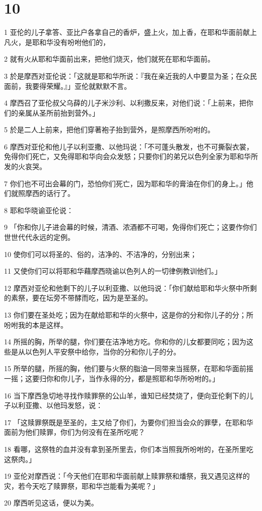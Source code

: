 \chapter{10}

\par 1 亚伦的儿子拿答、亚比户各拿自己的香炉，盛上火，加上香，在耶和华面前献上凡火，是耶和华没有吩咐他们的，
\par 2 就有火从耶和华面前出来，把他们烧灭，他们就死在耶和华面前。
\par 3 於是摩西对亚伦说：「这就是耶和华所说：『我在亲近我的人中要显为圣；在众民面前，我要得荣耀。』」亚伦就默默不言。
\par 4 摩西召了亚伦叔父乌薛的儿子米沙利、以利撒反来，对他们说：「上前来，把你们的亲属从圣所前抬到营外。」
\par 5 於是二人上前来，把他们穿著袍子抬到营外，是照摩西所吩咐的。
\par 6 摩西对亚伦和他儿子以利亚撒、以他玛说：「不可蓬头散发，也不可撕裂衣裳，免得你们死亡，又免得耶和华向会众发怒；只要你们的弟兄以色列全家为耶和华所发的火哀哭。
\par 7 你们也不可出会幕的门，恐怕你们死亡，因为耶和华的膏油在你们的身上。」他们就照摩西的话行了。
\par 8 耶和华晓谕亚伦说：
\par 9 「你和你儿子进会幕的时候，清酒、浓酒都不可喝，免得你们死亡；这要作你们世世代代永远的定例。
\par 10 使你们可以将圣的、俗的，洁净的、不洁净的，分别出来；
\par 11 又使你们可以将耶和华藉摩西晓谕以色列人的一切律例教训他们。」
\par 12 摩西对亚伦和他剩下的儿子以利亚撒、以他玛说：「你们献给耶和华火祭中所剩的素祭，要在坛旁不带酵而吃，因为是至圣的。
\par 13 你们要在圣处吃；因为在献给耶和华的火祭中，这是你的分和你儿子的分；所吩咐我的本是这样。
\par 14 所摇的胸，所举的腿，你们要在洁净地方吃。你和你的儿女都要同吃；因为这些是从以色列人平安祭中给你，当你的分和你儿子的分。
\par 15 所举的腿，所摇的胸，他们要与火祭的脂油一同带来当摇祭，在耶和华面前摇一摇；这要归你和你儿子，当作永得的分，都是照耶和华所吩咐的。」
\par 16 当下摩西急切地寻找作赎罪祭的公山羊，谁知已经焚烧了，便向亚伦剩下的儿子以利亚撒、以他玛发怒，说：
\par 17 「这赎罪祭既是至圣的，主又给了你们，为要你们担当会众的罪孽，在耶和华面前为他们赎罪，你们为何没有在圣所吃呢？
\par 18 看哪，这祭牲的血并没有拿到圣所里去，你们本当照我所吩咐的，在圣所里吃这祭肉。」
\par 19 亚伦对摩西说：「今天他们在耶和华面前献上赎罪祭和燔祭，我又遇见这样的灾，若今天吃了赎罪祭，耶和华岂能看为美呢？」
\par 20 摩西听见这话，便以为美。

